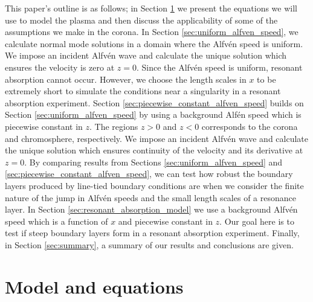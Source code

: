 \documentclass[linenumbers]{aastex63}
\begin{document}
This paper's outline is as follows; in Section \ref{sec:model_and_equations} we present the equations we will use to model the plasma and then discuss the applicability of some of the assumptions we make in the corona. In Section \ref{sec:uniform_alfven_speed}, we calculate normal mode solutions in a domain where the Alfv\'en speed is uniform. We impose an incident Alfv\'en wave and calculate the unique solution which ensures the velocity is zero at $z=0$. Since the Alfv\'en speed is uniform, resonant absorption cannot occur. However, we choose the length scales in $x$ to be extremely short to simulate the conditions near a singularity in a resonant absorption experiment. Section \ref{sec:piecewise_constant_alfven_speed} builds on Section \ref{sec:uniform_alfven_speed} by using a background Alf\'en speed which is piecewise constant in $z$. The regions $z>0$ and $z<0$ corresponds to the corona and chromosphere, respectively. We impose an incident Alfv\'en wave and calculate the unique solution which ensures continuity of the velocity and its derivative at $z=0$. By comparing results from Sections \ref{sec:uniform_alfven_speed} and \ref{sec:piecewise_constant_alfven_speed}, we can test how robust the boundary layers produced by line-tied boundary conditions are when we consider the finite nature of the jump in Alfv\'en speeds and the small length scales of a resonance layer. In Section \ref{sec:resonant_absorption_model} we use a background Alfv\'en speed which is a function of $x$ and piecewise constant in $z$. Our goal here is to test if steep boundary layers form in a resonant absorption experiment. Finally, in Section \ref{sec:summary}, a summary of our results and conclusions are given.

\section{Model and equations}
\label{sec:model_and_equations}
\end{document}
